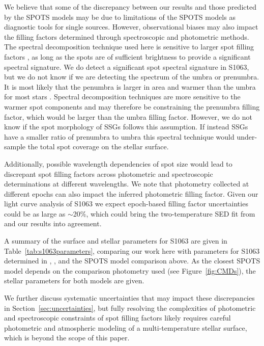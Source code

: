 \documentclass[trackchanges]{aastex631}
\begin{document}
We believe that some of the discrepancy between our results and those predicted by the SPOTS models may be due to limitations of the SPOTS models as diagnostic tools for single sources. However, observational biases may also impact the filling factors determined through spectroscopic and photometric methods. The spectral decomposition technique used here is sensitive to larger spot filling factors \citep{gullysantiago17}, as long as the spots are of sufficient brightness to provide a significant spectral signature. We do detect a significant spot spectral signature in S1063, but we do not know if we are detecting the spectrum of the umbra or prenumbra. It is most likely that the penumbra is larger in area and warmer than the umbra for most stars \citep{1981ApJ...250..327V}. Spectral decomposition techniques are more sensitive to the warmer spot components and may therefore be constraining the prenumbra filling factor, which would be larger than the umbra filling factor. However, we do not know if the spot morphology of SSGs follows this assumption. If instead SSGs have a smaller ratio of prenumbra to umbra this spectral technique would under-sample the total spot coverage on the stellar surface.

Additionally, possible wavelength dependencies of spot size would lead to discrepant spot filling factors across photometric and spectroscopic determinations at different wavelengths. We note that photometry collected at different epochs can also impact the inferred photometric filling factor. Given our light curve analysis of S1063 we expect epoch-based filling factor uncertainties could be as large as $\sim$20\%, which could bring the two-temperature SED fit from \citet{leiner17} and our results into agreement.

A summary of the surface and stellar parameters for S1063 are given in Table~\ref{tab:s1063parameters}, comparing our work here with parameters for S1063 determined in \citet{mathieu03}, \citet{leiner17}, and the SPOTS model comparison above. As the closest SPOTS model depends on the comparison photometry used (see Figure~\ref{fig:CMDs}), the stellar parameters for both models are given.

We further discuss systematic uncertainties that may impact these discrepancies in Section~\ref{sec:uncertainties}, but fully resolving the complexities of photometric and spectroscopic constraints of spot filling factors likely requires careful photometric and atmospheric modeling of a multi-temperature stellar surface, which is beyond the scope of this paper.
\end{document}
